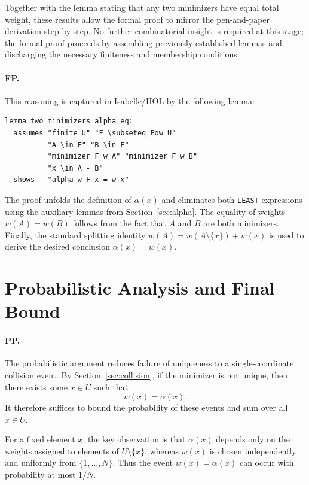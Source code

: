 Together with the lemma stating that any two minimizers have equal total weight, these results allow the formal proof to mirror the pen-and-paper derivation step by step.
No further combinatorial insight is required at this stage; the formal proof proceeds by assembling previously established lemmas and discharging the necessary finiteness and membership conditions.

\paragraph{FP.}

This reasoning is captured in Isabelle/HOL by the following lemma:

\biglistingneedspace
\begin{lstlisting}[language=Isabelle, caption={Collision Witnessed by a Single Coordinate}]
lemma two_minimizers_alpha_eq:
  assumes "finite U" "F \subseteq Pow U"
          "A \in F" "B \in F"
          "minimizer F w A" "minimizer F w B"
          "x \in A - B"
  shows   "alpha w F x = w x"
\end{lstlisting}


The proof unfolds the definition of $\alpha(x)$ and eliminates both \texttt{LEAST} expressions using the auxiliary lemmas from Section~\ref{sec:alpha}.
The equality of weights $w(A)=w(B)$ follows from the fact that $A$ and $B$ are both minimizers.
Finally, the standard splitting identity $w(A) = w(A \setminus \{x\}) + w(x)$ is used to derive the desired conclusion $\alpha(x) = w(x)$.


\section{Probabilistic Analysis and Final Bound}
\label{sec:probability}

\paragraph{PP.}

The probabilistic argument reduces failure of uniqueness to a single-coordinate collision event.
By Section~\ref{sec:collision}, if the minimizer is not unique, then there exists some $x \in U$ such that
\[
w(x) = \alpha(x).
\]
It therefore suffices to bound the probability of these events and sum over all $x \in U$.

For a fixed element $x$, the key observation is that $\alpha(x)$ depends only on the weights assigned to elements of $U \setminus \{x\}$, whereas $w(x)$ is chosen independently and uniformly from $\{1,\dots,N\}$.
Thus the event $w(x)=\alpha(x)$ can occur with probability at most $1/N$.

